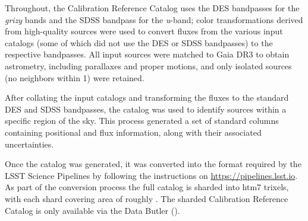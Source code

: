 Throughout, the Calibration Reference Catalog uses the \gls{DES} bandpasses for the \textit{grizy} bands and the \gls{SDSS} bandpass for the \textit{u}-band; color transformations derived from high-quality sources were used to convert fluxes from the various input catalogs (some of which did not use the \gls{DES} or SDSS bandpasses) to the respective bandpasses.
All input sources were matched to \gls{Gaia} \gls{DR3} to obtain astrometry, including parallaxes and proper motions, and only isolated sources (no neighbors within 1\arcsec) were retained.

After collating the input catalogs and transforming the fluxes to the standard DES and \gls{SDSS} bandpasses, the catalog was used to identify sources within a specific region of the sky.
This process generated a set of standard columns containing positional and \gls{flux} information, along with their associated uncertainties.

Once the catalog was generated, it was converted into the format required by the LSST Science Pipelines by following the instructions on \url{https://pipelines.lsst.io}.
As part of the conversion process the full catalog is sharded into \ncalrefcat htm7 trixels, with each shard covering area of roughly \shardarea.
The sharded Calibration Reference Catalog is only available via the Data \gls{Butler} ().



